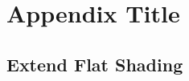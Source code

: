 \documentclass[12pt]{report}
\begin{document}
% 

\appendix
\chapter{Appendix Title}
% 

\section{Extend Flat Shading}

\end{document}
